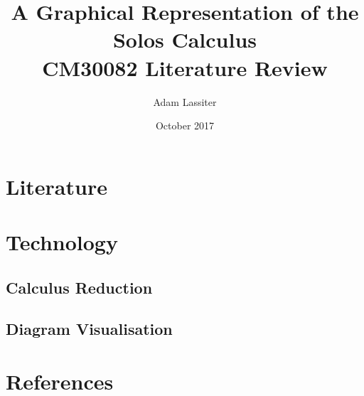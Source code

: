 \documentclass{article}
\title{A Graphical Representation of the Solos Calculus \\
	\large CM30082 Literature Review}
\author{Adam Lassiter}
\date{October 2017}
\begin{document}
\maketitle

\vfill

\tableofcontents

\pagebreak



\section{Literature}

    


    


    


    


    



\section{Technology}

    \subsection{Calculus Reduction}


    \subsection{Diagram Visualisation}



\pagebreak

\section{References}

    



\end{document}
